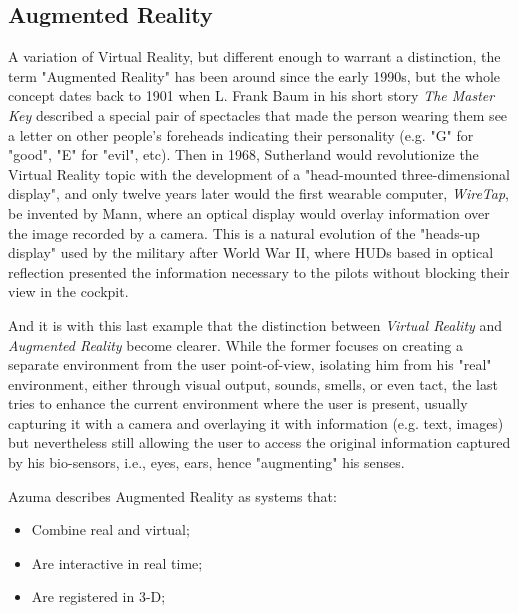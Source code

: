 \documentclass[runningheads]{llncs}
\begin{document}
\subsection{Augmented Reality}
\par A variation of Virtual Reality, but different enough to warrant a distinction, the term "Augmented Reality" has been around since the early 1990s, but the whole concept dates back to 1901 when L. Frank Baum in his short story \textit{The Master Key} described a special pair of spectacles that made the person wearing them see a letter on other people's foreheads indicating their personality (e.g. "G" for "good", "E" for "evil", etc). Then in 1968, Sutherland would revolutionize the Virtual Reality topic with the development of a "head-mounted three-dimensional display", and only twelve years later would the first wearable computer, \textit{WireTap}, be invented by Mann, where an optical display would overlay information over the image recorded by a camera. This is a natural evolution of the "heads-up display" used by the military after World War II, where HUDs based in optical reflection presented the information necessary to the pilots without blocking their view in the cockpit.
\par And it is with this last example that the distinction between \textit{Virtual Reality} and \textit{Augmented Reality} become clearer. While the former focuses on creating a separate environment from the user point-of-view, isolating him from his "real" environment, either through visual output, sounds, smells, or even tact, the last tries to enhance the current environment where the user is present, usually capturing it with a camera and overlaying it with information (e.g. text, images) but nevertheless still allowing the user to access the original information captured by his bio-sensors, i.e., eyes, ears, hence "augmenting" his senses.
\par Azuma describes Augmented Reality as systems that:
\begin{itemize}
    \item Combine real and virtual;
    \item Are interactive in real time;
    \item Are registered in 3-D;
\end{itemize}
\end{document}
